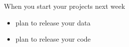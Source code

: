 \documentclass[aspectratio=169]{beamer}
\begin{document}
%
%
%
%
%
%
%
%
\begin{frame}

When you start your projects next week
\begin{itemize}
\item plan to release your data
\item plan to release your code
\end{itemize}

\end{frame}
\end{document}
